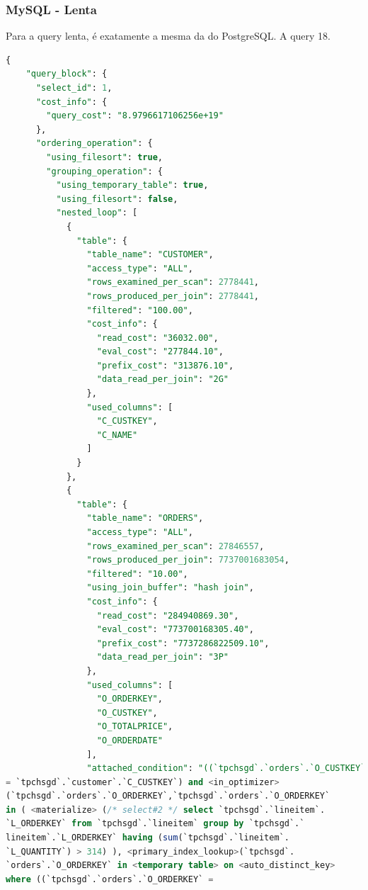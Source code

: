 \documentclass{article}
\begin{document}
\subsubsection{MySQL - Lenta}
\texttt{}\par Para a query lenta, é exatamente a mesma da do PostgreSQL. A query 18.
\begin{lstlisting}[language=SQL]
  {
    "query_block": {
      "select_id": 1,
      "cost_info": {
        "query_cost": "8.9796617106256e+19"
      },
      "ordering_operation": {
        "using_filesort": true,
        "grouping_operation": {
          "using_temporary_table": true,
          "using_filesort": false,
          "nested_loop": [
            {
              "table": {
                "table_name": "CUSTOMER",
                "access_type": "ALL",
                "rows_examined_per_scan": 2778441,
                "rows_produced_per_join": 2778441,
                "filtered": "100.00",
                "cost_info": {
                  "read_cost": "36032.00",
                  "eval_cost": "277844.10",
                  "prefix_cost": "313876.10",
                  "data_read_per_join": "2G"
                },
                "used_columns": [
                  "C_CUSTKEY",
                  "C_NAME"
                ]
              }
            },
            {
              "table": {
                "table_name": "ORDERS",
                "access_type": "ALL",
                "rows_examined_per_scan": 27846557,
                "rows_produced_per_join": 7737001683054,
                "filtered": "10.00",
                "using_join_buffer": "hash join",
                "cost_info": {
                  "read_cost": "284940869.30",
                  "eval_cost": "773700168305.40",
                  "prefix_cost": "7737286822509.10",
                  "data_read_per_join": "3P"
                },
                "used_columns": [
                  "O_ORDERKEY",
                  "O_CUSTKEY",
                  "O_TOTALPRICE",
                  "O_ORDERDATE"
                ],
                "attached_condition": "((`tpchsgd`.`orders`.`O_CUSTKEY` 
= `tpchsgd`.`customer`.`C_CUSTKEY`) and <in_optimizer>
(`tpchsgd`.`orders`.`O_ORDERKEY`,`tpchsgd`.`orders`.`O_ORDERKEY` 
in ( <materialize> (/* select#2 */ select `tpchsgd`.`lineitem`.
`L_ORDERKEY` from `tpchsgd`.`lineitem` group by `tpchsgd`.`
lineitem`.`L_ORDERKEY` having (sum(`tpchsgd`.`lineitem`.
`L_QUANTITY`) > 314) ), <primary_index_lookup>(`tpchsgd`.
`orders`.`O_ORDERKEY` in <temporary table> on <auto_distinct_key>
where ((`tpchsgd`.`orders`.`O_ORDERKEY` = 

\end{lstlisting}
\end{document}
